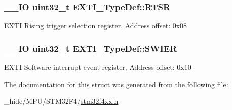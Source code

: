 \subsubsection[{R\+T\+S\+R}]{\setlength{\rightskip}{0pt plus 5cm}\+\_\+\+\_\+\+I\+O uint32\+\_\+t E\+X\+T\+I\+\_\+\+Type\+Def\+::\+R\+T\+S\+R}\label{struct_e_x_t_i___type_def_ac019d211d8c880b327a1b90a06cc0675}
E\+X\+T\+I Rising trigger selection register, Address offset\+: 0x08 \hypertarget{struct_e_x_t_i___type_def_a5c1f538e64ee90918cd158b808f5d4de}{}
\subsubsection[{S\+W\+I\+E\+R}]{\setlength{\rightskip}{0pt plus 5cm}\+\_\+\+\_\+\+I\+O uint32\+\_\+t E\+X\+T\+I\+\_\+\+Type\+Def\+::\+S\+W\+I\+E\+R}\label{struct_e_x_t_i___type_def_a5c1f538e64ee90918cd158b808f5d4de}
E\+X\+T\+I Software interrupt event register, Address offset\+: 0x10 

The documentation for this struct was generated from the following file\+:\begin{DoxyCompactItemize}
\item 
\+\_\+hide/\+M\+P\+U/\+S\+T\+M32\+F4/\hyperlink{stm32f4xx_8h}{stm32f4xx.\+h}\end{DoxyCompactItemize}
